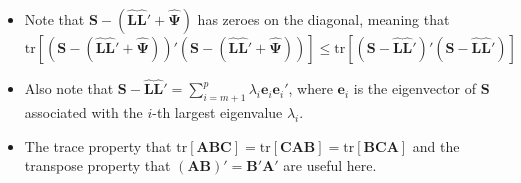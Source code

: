 \documentclass[
  letterpaper,
  DIV=11,
  numbers=noendperiod]{scrartcl}
\providecommand{\tightlist}{%
  \setlength{\itemsep}{0pt}\setlength{\parskip}{0pt}}\usepackage{longtable,booktabs,array}
\begin{document}
\begin{itemize}
\tightlist
\item
  Note that
  \(\mathbf{S}-(\hat{\mathbf{L}}\hat{\mathbf{L}}' + \hat{\mathbf{\Psi}})\)
  has zeroes on the diagonal, meaning that
  \(\mathrm{tr}[(\mathbf{S}-(\hat{\mathbf{L}}\hat{\mathbf{L}}' + \hat{\mathbf{\Psi}}))'(\mathbf{S}-(\hat{\mathbf{L}}\hat{\mathbf{L}}' + \hat{\mathbf{\Psi}}))]\leq \mathrm{tr}[(\mathbf{S}-\hat{\mathbf{L}}\hat{\mathbf{L}}')'(\mathbf{S}-\hat{\mathbf{L}}\hat{\mathbf{L}}')]\)
\item
  Also note that
  \(\mathbf{S}-\hat{\mathbf{L}}\hat{\mathbf{L}}'=\sum_{i=m+1}^p\lambda_i\mathbf{e}_i\mathbf{e}_i'\),
  where \(\mathbf{e}_i\) is the eigenvector of \(\mathbf{S}\) associated
  with the \(i\)-th largest eigenvalue \(\lambda_i\).
\item
  The trace property that
  \(\mathrm{tr}[\mathbf{A}\mathbf{B}\mathbf{C}]=\mathrm{tr}[\mathbf{C}\mathbf{A}\mathbf{B}]=\mathrm{tr}[\mathbf{B}\mathbf{C}\mathbf{A}]\)
  and the transpose property that
  \((\mathbf{A}\mathbf{B})'=\mathbf{B}'\mathbf{A}'\) are useful here.
\end{itemize}
\end{document}
